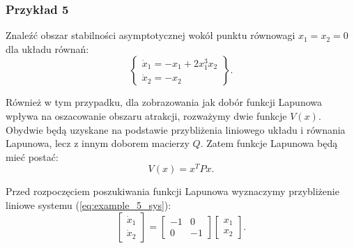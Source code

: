\documentclass{article}
\begin{document}
        \subsubsection{Przykład 5}
        Znaleźć obszar stabilności asymptotycznej wokół punktu równowagi $x_{1}=x_{2}=0$ dla układu równań:
        \begin{equation}\label{eq:example_5_sys}
            \left\{
            \begin{array}{l}
                 \dot{x}_{1} = -x_{1} + 2x_{1}^{3}x_{2}\\
                 \dot{x}_{2} = -x_{2}
            \end{array}
            \right\}.
        \end{equation}

        Również w tym przypadku, dla zobrazowania jak dobór funkcji Lapunowa wpływa na oszacowanie obszaru atrakcji, rozważymy dwie funkcje $V(x)$.
        Obydwie będą uzyskane na podstawie przybliżenia liniowego układu i równania Lapunowa, lecz z innym doborem macierzy $Q$.
        Zatem funkcje Lapunowa będą mieć postać:
        $$
            V(x) = x^{T}Px.
        $$

        Przed rozpoczęciem poszukiwania funkcji Lapunowa wyznaczymy przybliżenie liniowe systemu (\ref{eq:example_5_sys}):
        $$
            \begin{bmatrix} \dot{x}_{1} \\ \dot{x}_{2} \end{bmatrix}
            =
            \begin{bmatrix} -1 & 0 \\ 0 & -1 \end{bmatrix}
            \begin{bmatrix} x_{1} \\ x_{2} \end{bmatrix}.
        $$
\end{document}

